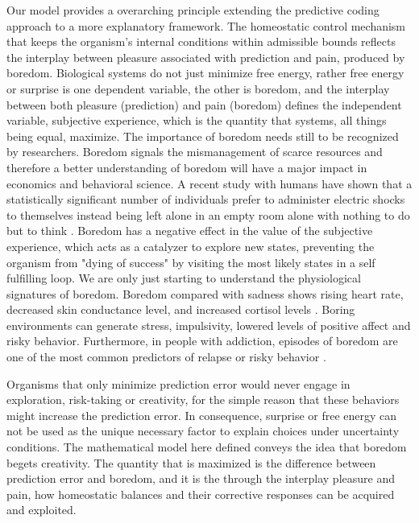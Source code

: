 \documentclass[11pt, onecolumn]{article}
\newcommand{\myreferences}{C:/workspace/github/bibliography-jgr/bibliojgr}
\begin{document}
Our model provides a overarching principle extending the predictive coding approach  to a more explanatory framework. The homeostatic control mechanism that keeps the organism's internal conditions within admissible bounds reflects the interplay between pleasure associated with prediction and pain, produced by boredom.
Biological systems do not just minimize free energy, rather free energy or surprise is one dependent variable, the other is boredom, and the interplay between both pleasure (prediction) and pain (boredom) defines the independent variable, subjective experience, which is the quantity that systems, all things being equal, maximize. 
The importance of boredom needs still to be recognized by researchers. Boredom signals the mismanagement of scarce resources and therefore a better  understanding of boredom will have a major impact in economics and behavioral science. A recent study with humans have shown that a statistically significant number of individuals prefer to administer electric shocks to themselves instead being left alone in an empty room alone with nothing to do but to think \citep{wilson_just_2014}. Boredom has a negative effect in the value of the subjective experience, which acts as a catalyzer to explore new states, preventing the organism from "dying of success" by visiting the most likely states  in a self fulfilling loop. We are only just starting to understand the physiological signatures of boredom. Boredom compared with sadness shows rising heart rate, decreased skin conductance level, and increased cortisol levels \citep{merrifield_characterizing_2014}. Boring environments can generate stress, impulsivity, lowered levels of positive affect and risky behavior. Furthermore, in people with addiction, episodes of  boredom are one of the most common predictors of relapse or risky behavior \citep{blaszczynski_boredom_1990}.


Organisms that only minimize prediction error would never engage in exploration, risk-taking or creativity, for the simple reason that these behaviors might increase the prediction error. 
In consequence, surprise or free energy can not be used as the unique necessary factor to explain choices under uncertainty conditions. The mathematical model here defined conveys the idea that boredom begets creativity. The quantity that is maximized is the difference between prediction error and boredom, and it is the through the interplay pleasure and pain, how homeostatic balances and their corrective responses can be acquired and exploited.


%



\end{document}
